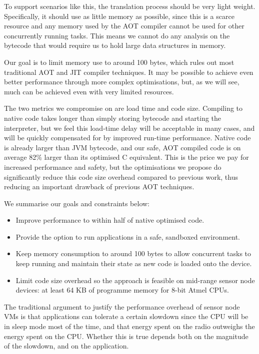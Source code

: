 To support scenarios like this, the translation process should be very light weight. Specifically, it should use as little memory as possible, since this is a scarce resource and any memory used by the AOT compiler cannot be used for other concurrently running tasks. This means we cannot do any analysis on the bytecode that would require us to hold large data structures in memory.

Our goal is to limit memory use to around 100 bytes, which rules out most traditional AOT and JIT compiler techniques. It may be possible to achieve even better performance through more complex optimisations, but, as we will see, much can be achieved even with very limited resources.

The two metrics we compromise on are load time and code size. Compiling to native code takes longer than simply storing bytecode and starting the interpreter, but we feel this load-time delay will be acceptable in many cases, and will be quickly compensated for by improved run-time performance. Native code is already larger than JVM bytecode, and our safe, AOT compiled code is on average 82\% larger than its optimised C equivalent. This is the price we pay for increased performance and safety, but the optimisations we propose do significantly reduce this code size overhead compared to previous work, thus reducing an important drawback of previous AOT techniques.

We summarise our goals and constraints below:
\begin{itemize}
  \item Improve performance to within half of native optimised code.
  \item Provide the option to run applications in a safe, sandboxed environment.
  \item Keep memory consumption to around 100 bytes to allow concurrent tasks to keep running and maintain their state as new code is loaded onto the device.
  \item Limit code size overhead so the approach is feasible on mid-range sensor node devices: at least 64 KB of programme memory for 8-bit Atmel CPUs.
\end{itemize}

The traditional argument to justify the performance overhead of sensor node VMs is that applications can tolerate a certain slowdown since the CPU will be in sleep mode most of the time, and that energy spent on the radio outweighs the energy spent on the CPU. Whether this is true depends both on the magnitude of the slowdown, and on the application.

